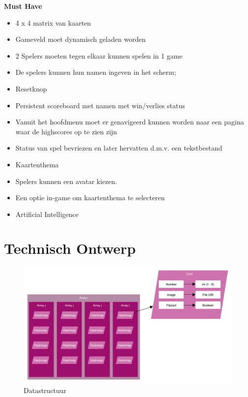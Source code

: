 \documentclass[a4paper,titlepage,11pt]{article}
\begin{document}
{\bf Must Have}

\begin{itemize}
\item 4 x 4 matrix van kaarten
\item Gameveld moet dynamisch geladen worden
\item 2 Spelers moeten tegen elkaar kunnen spelen in 1 game
\item De spelers kunnen hun namen ingeven in het scherm;
\item Resetknop
\item Persistent scoreboard met namen met win/verlies status
\item Vanuit het hoofdmenu moet er genavigeerd kunnen worden naar een pagina waar de 
  highscores op te zien zijn
\item Status van spel bevriezen en later hervatten d.m.v. een tekstbestand
\end{itemize}

\begin{itemize}
\item Kaartenthema
\end{itemize}
\begin{itemize}
\item Spelers kunnen een avatar kiezen.
\end{itemize}
\begin{itemize}
\item Een optie in-game om kaartenthema te selecteren
\item Artificial Intelligence
\end{itemize}

\clearpage

\section{Technisch Ontwerp}

\begin{figure}[!hb]
  \includegraphics[width=\linewidth]{../Images/datastructure.pdf}
  \caption{Datastructuur}\label{fig:datastructure}
\end{figure}
\end{document}
